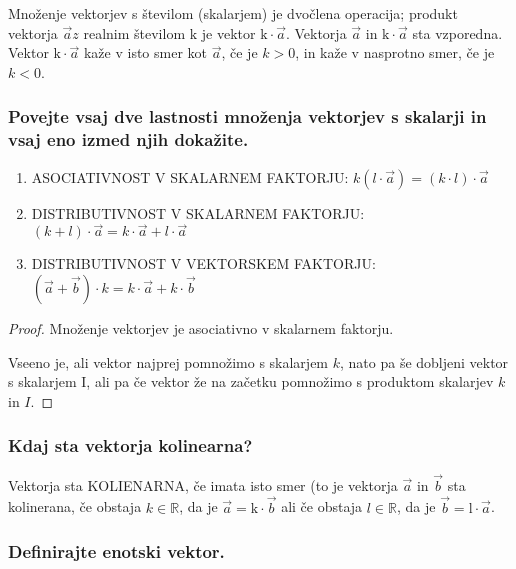 \documentclass{article}
\begin{document}
Množenje vektorjev s številom (skalarjem) je dvočlena operacija; produkt vektorja $\vec{a} z$ realnim številom $\mathrm{k}$ je vektor $\mathrm{k} \cdot \overrightarrow{a}$. Vektorja $\overrightarrow{a}$ in $\mathrm{k} \cdot \overrightarrow{a}$ sta vzporedna. Vektor $\mathrm{k} \cdot \overrightarrow{a}$ kaže v isto smer kot $\vec{a}$, če je $k>0$, in kaže v nasprotno smer, če je $k<0$.

\subsubsection*{Povejte vsaj dve lastnosti množenja vektorjev s skalarji in vsaj eno izmed njih dokažite.}

\begin{enumerate}
    \item ASOCIATIVNOST V SKALARNEM FAKTORJU: $k(l \cdot \overrightarrow{a})=(k \cdot l) \cdot \overrightarrow{a}$
    \item DISTRIBUTIVNOST V SKALARNEM FAKTORJU: $(k+l) \cdot \overrightarrow{a}=k \cdot \overrightarrow{a}+l \cdot \overrightarrow{a}$
    \item DISTRIBUTIVNOST V VEKTORSKEM FAKTORJU: $(\overrightarrow{a}+\overrightarrow{b}) \cdot k=k \cdot \overrightarrow{a}+k \cdot \overrightarrow{b}$
\end{enumerate}

\begin{proof}
    Množenje vektorjev je asociativno v skalarnem faktorju.

    Vseeno je, ali vektor najprej pomnožimo s skalarjem $k$, nato pa še dobljeni vektor s skalarjem I, ali pa če vektor že na začetku pomnožimo s produktom skalarjev $k$ in $I$.
\end{proof}

\subsubsection*{Kdaj sta vektorja kolinearna?}

Vektorja sta KOLIENARNA, če imata isto smer (to je vektorja $\vec{a}$ in $\vec{b}$ sta kolinerana, če obstaja $k \in \mathbb{R}$, da je $\overrightarrow{a}=\mathrm{k} \cdot \overrightarrow{b}$ ali če obstaja $l \in \mathbb{R}$, da je $\overrightarrow{b}=\mathrm{l} \cdot \overrightarrow{a}$.

\subsubsection*{Definirajte enotski vektor.}
\end{document}
